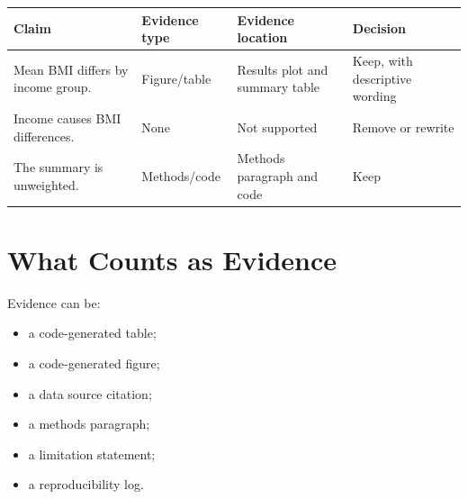 \documentclass[
  letterpaper,
  DIV=11,
  numbers=noendperiod,
  oneside]{scrreprt}
\providecommand{\tightlist}{%
  \setlength{\itemsep}{0pt}\setlength{\parskip}{0pt}}
\begin{document}
\begin{longtable}[]{@{}
  >{\raggedright\arraybackslash}p{}
  >{\raggedright\arraybackslash}p{}
  >{\raggedright\arraybackslash}p{}
  >{\raggedright\arraybackslash}p{}@{}}
\toprule\noalign{}
\begin{minipage}[b]{\linewidth}\raggedright
Claim
\end{minipage} & \begin{minipage}[b]{\linewidth}\raggedright
Evidence type
\end{minipage} & \begin{minipage}[b]{\linewidth}\raggedright
Evidence location
\end{minipage} & \begin{minipage}[b]{\linewidth}\raggedright
Decision
\end{minipage} \\
\midrule\noalign{}
\endhead
\bottomrule\noalign{}
\endlastfoot
Mean BMI differs by income group. & Figure/table & Results plot and
summary table & Keep, with descriptive wording \\
Income causes BMI differences. & None & Not supported & Remove or
rewrite \\
The summary is unweighted. & Methods/code & Methods paragraph and code &
Keep \\
\end{longtable}

\section*{What Counts as Evidence}\label{what-counts-as-evidence-1}


Evidence can be:

\begin{itemize}
\tightlist
\item
  a code-generated table;
\item
  a code-generated figure;
\item
  a data source citation;
\item
  a methods paragraph;
\item
  a limitation statement;
\item
  a reproducibility log.
\end{itemize}
\end{document}
